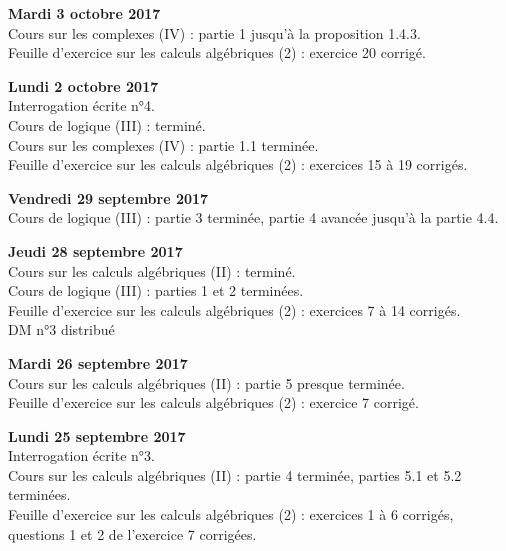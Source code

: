 \documentclass[12pt,a4paper]{article}
\begin{document}
\noindent\textbf{Mardi 3 octobre 2017}\\
\bu{} Cours sur les complexes (IV) : partie 1 jusqu'à la proposition 1.4.3. \\
\bu{} Feuille d'exercice sur les calculs algébriques (2) : exercice 20 corrigé. \\
\vspace{.4cm}

\noindent\textbf{Lundi 2 octobre 2017}\\
\bu{} Interrogation écrite n°4.\\
\bu{} Cours de logique (III) : terminé. \\
\bu{} Cours sur les complexes (IV) : partie 1.1 terminée. \\
\bu{} Feuille d'exercice sur les calculs algébriques (2) : exercices 15 à 19 corrigés. \\
\vspace{.4cm}

\noindent\textbf{Vendredi 29 septembre 2017}\\
\bu{} Cours de logique (III) : partie 3 terminée, partie 4 avancée jusqu'à la partie 4.4. \\
\vspace{.4cm}

\noindent\textbf{Jeudi 28 septembre 2017}\\
\bu{} Cours sur les calculs algébriques (II) : terminé. \\
\bu{} Cours de logique (III) : parties 1 et 2 terminées. \\
\bu{} Feuille d'exercice sur les calculs algébriques (2) : exercices 7 à 14 corrigés.  \\
\bu{} DM n°3 distribué\\
\vspace{.4cm}

\noindent\textbf{Mardi 26 septembre 2017}\\
\bu{} Cours sur les calculs algébriques (II) : partie 5 presque terminée. \\
\bu{} Feuille d'exercice sur les calculs algébriques (2) : exercice 7 corrigé.  \\
\vspace{.4cm}

\noindent\textbf{Lundi 25 septembre 2017}\\
\bu{} Interrogation écrite n°3.\\
\bu{} Cours sur les calculs algébriques (II) : partie 4 terminée, parties 5.1 et 5.2 terminées. \\
\bu{} Feuille d'exercice sur les calculs algébriques (2) : exercices 1 à 6 corrigés, questions 1 et 2 de l'exercice 7 corrigées.  \\
\vspace{.4cm}
\end{document}
